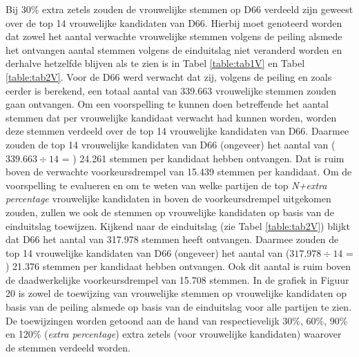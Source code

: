 Bij 30\% extra zetels zouden de vrouwelijke stemmen op D66 verdeeld zijn geweest over de top 14 vrouwelijke kandidaten van D66. Hierbij moet genoteerd worden dat zowel het aantal verwachte vrouwelijke stemmen volgens de peiling alsmede het ontvangen aantal stemmen volgens de einduitslag niet veranderd worden en derhalve hetzelfde blijven als te zien is in Tabel \ref{table:tab1V} en Tabel \ref{table:tab2V}. Voor de D66 werd verwacht dat zij, volgens de peiling en zoals eerder is berekend, een totaal aantal van 339.663 vrouwelijke stemmen zouden gaan ontvangen. Om een voorspelling te kunnen doen betreffende het aantal stemmen dat per vrouwelijke kandidaat verwacht had kunnen worden, worden deze stemmen verdeeld over de top 14 vrouwelijke kandidaten van D66. Daarmee zouden de top 14 vrouwelijke kandidaten van D66 (ongeveer) het aantal van ($339.663\div14$ = ) 24.261 stemmen per kandidaat hebben ontvangen. Dat is ruim boven de verwachte voorkeursdrempel van 15.439 stemmen per kandidaat. Om de voorspelling te evalueren en om te weten van welke partijen de top \textit{N+extra percentage} vrouwelijke kandidaten in boven de voorkeursdrempel uitgekomen zouden, zullen we ook de stemmen op vrouwelijke kandidaten op basis van de einduitslag toewijzen. Kijkend naar de einduitslag (zie Tabel \ref{table:tab2V}) blijkt dat D66 het aantal van 317.978 stemmen heeft ontvangen. Daarmee zouden de top 14 vrouwelijke kandidaten van D66 (ongeveer) het aantal van ($317.978\div14$ = ) 21.376 stemmen per kandidaat hebben ontvangen. Ook dit aantal is ruim boven de daadwerkelijke voorkeursdrempel van 15.708 stemmen. In de grafiek in Figuur 20 is zowel de toewijzing van vrouwelijke stemmen op vrouwelijke kandidaten op basis van de peiling alsmede op basis van de einduitslag voor alle partijen te zien. De toewijzingen worden getoond aan de hand van respectievelijk 30\%, 60\%, 90\% en 120\% (\textit{extra percentage}) extra zetels (voor vrouwelijke kandidaten) waarover de stemmen verdeeld worden.



